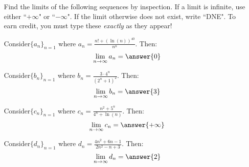 \documentclass{ximera}
\author{Jim Talamo}
\begin{document}
\begin{exercise}

Find the limits of the following sequences by inspection.  If a limit is infinite, use either ``$+\infty$" or ``$-\infty$".  If the limit otherwise does not exist, write ``DNE".  To earn credit, you must type these \emph{exactly} as they appear!

\begin{exercise}
Consider$\{a_n \}_{n=1}$ where $a_n = \frac{n!+(\ln(n) )^{40}}{n^n}$.  Then:
\[
\lim_{n \to \infty} a_n = \answer{0}
\]
\end{exercise}

\begin{exercise}
Consider$\{b_n \}_{n=1}$ where $b_n = \frac{3 \cdot 4^n}{(2^n+1)^2}$.  Then:
\[
\lim_{n \to \infty} b_n = \answer{3}
\]

\end{exercise}

\begin{exercise}
Consider$\{c_n \}_{n=1}$ where $c_n = \frac{n^2+5^n}{4^n + \ln(n)}$.  Then:
\[
\lim_{n \to \infty} c_n = \answer{+\infty}
\]
\end{exercise}

\begin{exercise}
Consider$\{d_n \}_{n=1}$ where $d_n = \frac{4n^2+6n-1}{2n^2-n+3}$.  Then:
\[
\lim_{n \to \infty} d_n =  \answer{2}
\]
\end{exercise}


\end{exercise}
\end{document}
